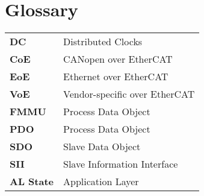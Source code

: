 \documentclass{article}
\newenvironment{simpleglossary}%
{%
\renewcommand{\arraystretch}{2.5}%
\renewcommand{\tabcolsep}{0.2cm}%
\begin{tabular}{ l  p{8cm}}}%
{\end{tabular}}
\newcommand{\entry}[2]{\bf{#1} & #2 \\}
\begin{document}
\section*{Glossary}

\begin{simpleglossary}
\entry{DC}{Distributed Clocks}
\entry{CoE}{CANopen over EtherCAT}
\entry{EoE}{Ethernet over EtherCAT}
\entry{VoE}{Vendor-specific over EtherCAT}

\entry{FMMU}{Process Data Object}
\entry{PDO}{Process Data Object}
\entry{SDO}{Slave Data Object}
\entry{SII}{Slave Information Interface}
\entry{AL State}{Application Layer}
\end{simpleglossary}
\end{document}
